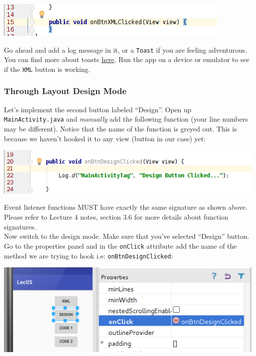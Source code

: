 \begin{center}
	\includegraphics[scale=0.4]{chapters/ch05/images/4}
\end{center}

Go ahead and add a log message in it, or a \texttt{Toast} if you are feeling adventurous.
You can find more about toasts \href{https://developer.android.com/guide/topics/ui/notifiers/toasts.html}{here}. Run the app on a device or emulator to see if the \texttt{XML} button is working.

\subsubsection{Through Layout Design Mode}
Let's implement the second button labeled ``Design''. Open up \texttt{MainActivity.java} and \textit{manually} add the following function (your line numbers may be different). Notice that the name of the function is greyed out. This is because we haven't hooked it to any view (button in our case) yet:

\begin{center}
	\includegraphics[scale=0.4]{chapters/ch05/images/5}
\end{center}

Event listener functions MUST have exactly the same signature as shown above. Please refer to Lecture 4 notes, section 3.6 for more details about function signatures. \\

Now switch to the design mode. Make sure that you've selected ``Design'' button. Go to the properties panel and in the \texttt{onClick} attribute add the name of the method we are trying to hook i.e: \texttt{onBtnDesignClicked}:

\begin{center}
	\includegraphics[scale=0.4]{chapters/ch05/images/6}
\end{center}

